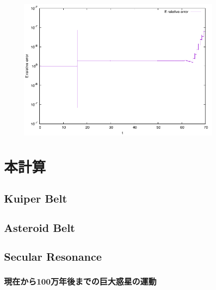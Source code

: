 \documentclass[11pt,a4paper,oneside,onecolumn]{jarticle}
\begin{document}
\begin{figure}[H]
\centering
\includegraphics[width=10cm]{./image/pythagoras_E_error.pdf}
\caption{\label{}}
\end{figure}

\section{本計算}
\subsection{Kuiper Belt}



\subsection{Asteroid Belt}



\subsection{Secular Resonance}

\subsubsection{現在から100万年後までの巨大惑星の運動}
\end{document}

